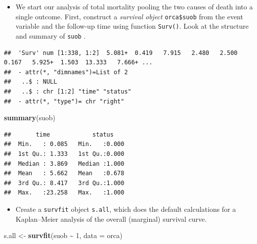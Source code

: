 \documentclass[
]{book}
\newenvironment{Shaded}{\begin{snugshade}}{\end{snugshade}}
\newcommand{\AttributeTok}[1]{\textcolor[rgb]{0.13,0.29,0.53}{#1}}
\newcommand{\DecValTok}[1]{\textcolor[rgb]{0.00,0.00,0.81}{#1}}
\newcommand{\FunctionTok}[1]{\textcolor[rgb]{0.13,0.29,0.53}{\textbf{#1}}}
\newcommand{\NormalTok}[1]{#1}
\newcommand{\OtherTok}[1]{\textcolor[rgb]{0.56,0.35,0.01}{#1}}
\newcommand{\SpecialCharTok}[1]{\textcolor[rgb]{0.81,0.36,0.00}{\textbf{#1}}}
\providecommand{\tightlist}{%
  \setlength{\itemsep}{0pt}\setlength{\parskip}{0pt}}
\begin{document}
\begin{itemize}
\tightlist
\item
  We start our analysis of total mortality pooling the two causes of death into
  a single outcome.
  First, construct a \emph{survival object} \texttt{orca\$suob} from
  the event variable and the follow-up time using function \texttt{Surv()}.
  Look at the structure and summary of \texttt{suob} .
\end{itemize}

\begin{Shaded}
\end{Shaded}

\begin{verbatim}
##  'Surv' num [1:338, 1:2]  5.081+  0.419   7.915   2.480   2.500   0.167   5.925+  1.503  13.333   7.666+ ...
##  - attr(*, "dimnames")=List of 2
##   ..$ : NULL
##   ..$ : chr [1:2] "time" "status"
##  - attr(*, "type")= chr "right"
\end{verbatim}

\begin{Shaded}
\begin{Highlighting}[]
\FunctionTok{summary}\NormalTok{(suob)}
\end{Highlighting}
\end{Shaded}

\begin{verbatim}
##       time            status     
##  Min.   : 0.085   Min.   :0.000  
##  1st Qu.: 1.333   1st Qu.:0.000  
##  Median : 3.869   Median :1.000  
##  Mean   : 5.662   Mean   :0.678  
##  3rd Qu.: 8.417   3rd Qu.:1.000  
##  Max.   :23.258   Max.   :1.000
\end{verbatim}

\begin{itemize}
\tightlist
\item
  Create a \texttt{survfit} object \texttt{s.all}, which does the
  default calculations for a Kaplan--Meier
  analysis of the overall (marginal) survival curve.
\end{itemize}

\begin{Shaded}
\begin{Highlighting}[]
\NormalTok{s.all }\OtherTok{\textless{}{-}} \FunctionTok{survfit}\NormalTok{(suob }\SpecialCharTok{\textasciitilde{}} \DecValTok{1}\NormalTok{, }\AttributeTok{data =}\NormalTok{ orca)}
\end{Highlighting}
\end{Shaded}
\end{document}
